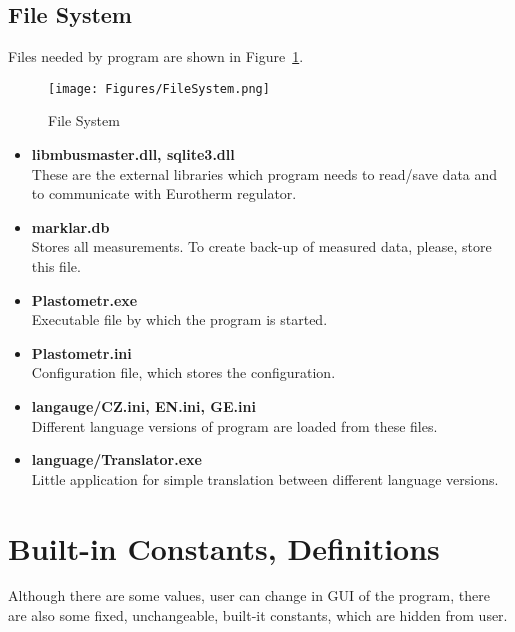 \documentclass[a4paper,11pt,oneside]{report}
\theoremstyle{named}
\begin{document}
\subsection{File System}

Files needed by program are shown in Figure~\ref{fig:FileSystem}.

\begin{figure}[t]
  \centering
  \texttt{[image: Figures/FileSystem.png]}
  \caption{File System}
  \label{fig:FileSystem}
\end{figure}

\begin{itemize}
  \item \textbf{libmbusmaster.dll, sqlite3.dll} \\
    These are the external libraries which program needs to read/save data and
    to communicate with Eurotherm regulator.
  \item \textbf{marklar.db} \\
    Stores all measurements. To create back-up of measured data, please, store
    this file. 
  \item \textbf{Plastometr.exe} \\
    Executable file by which the program is started. 
  \item \textbf{Plastometr.ini} \\
    Configuration file, which stores the configuration. 
  \item \textbf{langauge/CZ.ini, EN.ini, GE.ini} \\
    Different language versions of program are loaded from these files.
  \item \textbf{language/Translator.exe} \\
    Little application for simple translation between different language
    versions.
\end{itemize}

\section{Built-in Constants, Definitions}
\label{sec:BulitInConstants}

Although there are some values, user can change in GUI of the program, there are
also some fixed, unchangeable, built-it constants, which are hidden from user. 
\end{document}
